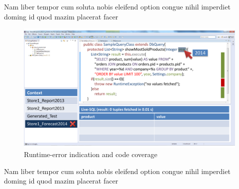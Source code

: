 Nam liber tempor cum soluta nobis eleifend option congue nihil imperdiet doming id quod mazim placerat facer
\begin{figure}
\begin{centering}
    \includegraphics[width=1.0\linewidth]{images/error}
    \caption{Runtime-error indication and code coverage}
    \label{fig:final_prototype_error}
\end{centering}
\end{figure}
Nam liber tempor cum soluta nobis eleifend option congue nihil imperdiet doming id quod mazim placerat facer